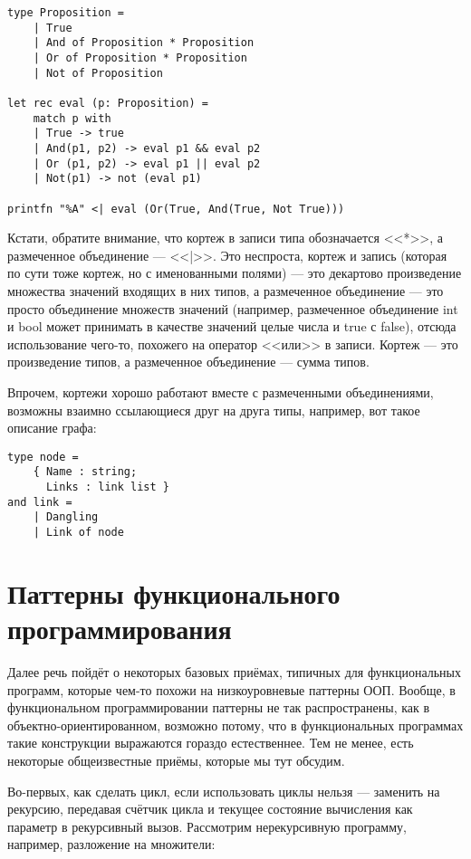 \documentclass{../../text-style}
\begin{document}
\begin{verbatim}
type Proposition =
    | True
    | And of Proposition * Proposition
    | Or of Proposition * Proposition
    | Not of Proposition

let rec eval (p: Proposition) =
    match p with
    | True -> true
    | And(p1, p2) -> eval p1 && eval p2
    | Or (p1, p2) -> eval p1 || eval p2
    | Not(p1) -> not (eval p1)

printfn "%A" <| eval (Or(True, And(True, Not True)))
\end{verbatim}

Кстати, обратите внимание, что кортеж в записи типа обозначается <<*>>, а размеченное объединение --- <<|>>. Это неспроста, кортеж и запись (которая по сути тоже кортеж, но с именованными полями) --- это декартово произведение множества значений входящих в них типов, а размеченное объединение --- это просто объединение множеств значений (например, размеченное объединение int и bool может принимать в качестве значений целые числа и true с false), отсюда использование чего-то, похожего на оператор <<или>> в записи. Кортеж --- это произведение типов, а размеченное объединение --- сумма типов.

Впрочем, кортежи хорошо работают вместе с размеченными объединениями, возможны взаимно ссылающиеся друг на друга типы, например, вот такое описание графа:

\begin{verbatim}
type node =
    { Name : string;
      Links : link list }
and link =
    | Dangling
    | Link of node
\end{verbatim}

\section{Паттерны функционального программирования}

Далее речь пойдёт о некоторых базовых приёмах, типичных для функциональных программ, которые чем-то похожи на низкоуровневые паттерны ООП. Вообще, в функциональном программировании паттерны не так распространены, как в объектно-ориентированном, возможно потому, что в функциональных программах такие конструкции выражаются гораздо естественнее. Тем не менее, есть некоторые общеизвестные приёмы, которые мы тут обсудим.

Во-первых, как сделать цикл, если использовать циклы нельзя --- заменить на рекурсию, передавая счётчик цикла и текущее состояние вычисления как параметр в рекурсивный вызов. Рассмотрим нерекурсивную программу, например, разложение на множители:
\end{document}
